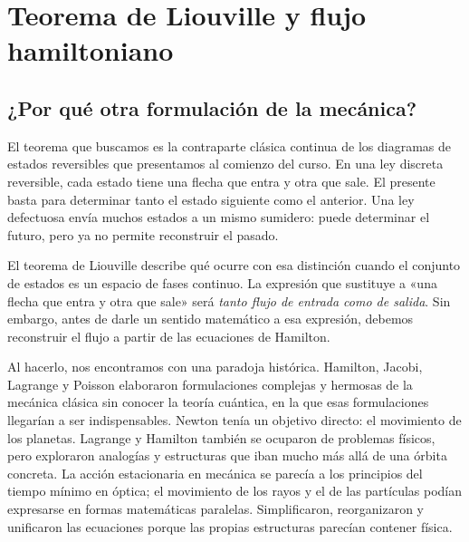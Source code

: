 \chapter{Teorema de Liouville y flujo hamiltoniano}


\section{¿Por qué otra formulación de la mecánica?}

El teorema que buscamos es la contraparte clásica continua de los diagramas de estados reversibles que presentamos al comienzo del curso. En una ley discreta reversible, cada estado tiene una flecha que entra y otra que sale. El presente basta para determinar tanto el estado siguiente como el anterior. Una ley defectuosa envía muchos estados a un mismo sumidero: puede determinar el futuro, pero ya no permite reconstruir el pasado.

El teorema de Liouville describe qué ocurre con esa distinción cuando el conjunto de estados es un espacio de fases continuo. La expresión que sustituye a «una flecha que entra y otra que sale» será \emph{tanto flujo de entrada como de salida}. Sin embargo, antes de darle un sentido matemático a esa expresión, debemos reconstruir el flujo a partir de las ecuaciones de Hamilton.

Al hacerlo, nos encontramos con una paradoja histórica. Hamilton, Jacobi, Lagrange y Poisson elaboraron formulaciones complejas y hermosas de la mecánica clásica sin conocer la teoría cuántica, en la que esas formulaciones llegarían a ser indispensables. Newton tenía un objetivo directo: el movimiento de los planetas. Lagrange y Hamilton también se ocuparon de problemas físicos, pero exploraron analogías y estructuras que iban mucho más allá de una órbita concreta. La acción estacionaria en mecánica se parecía a los principios del tiempo mínimo en óptica; el movimiento de los rayos y el de las partículas podían expresarse en formas matemáticas paralelas. Simplificaron, reorganizaron y unificaron las ecuaciones porque las propias estructuras parecían contener física.

